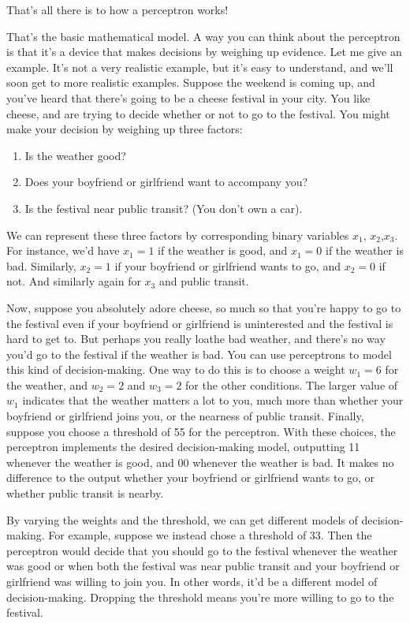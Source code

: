 \documentclass[a4paper,12pt]{report}%
\begin{document}
That's all there is to how a perceptron works!

That's the basic mathematical model. A way you can think about the perceptron is that it's a device that makes decisions by weighing up evidence. Let me give an example. It's not a very realistic example, but it's easy to understand, and we'll soon get to more realistic examples. Suppose the weekend is coming up, and you've heard that there's going to be a cheese festival in your city. You like cheese, and are trying to decide whether or not to go to the festival. You might make your decision by weighing up three factors:

\begin{enumerate}
 \item Is the weather good?
 \item Does your boyfriend or girlfriend want to accompany you?
 \item Is the festival near public transit? (You don't own a car).
\end{enumerate}

We can represent these three factors by corresponding binary variables $x_{1}$, $x_{2}$,$ x_{3}$. For instance, we'd have $x_{1} = 1$ if the weather is good, and $x_{1} = 0$ if the weather is bad. Similarly, $x_{2} = 1$ if your boyfriend or girlfriend wants to go, and $x_{2} = 0$ if not. And similarly again for $x_{3}$ and public transit.

Now, suppose you absolutely adore cheese, so much so that you're happy to go to the festival even if your boyfriend or girlfriend is uninterested and the festival is hard to get to. But perhaps you really loathe bad weather, and there's no way you'd go to the festival if the weather is bad. You can use perceptrons to model this kind of decision-making. One way to do this is to choose a weight $w_{1} = 6$ for the weather, and $w_{2} = 2$ and $w_{3} = 2$ for the other conditions. The larger value of $w_{1}$ indicates that the weather matters a lot to you, much more than whether your boyfriend or girlfriend joins you, or the nearness of public transit. Finally, suppose you choose a threshold of 55 for the perceptron. With these choices, the perceptron implements the desired decision-making model, outputting 11 whenever the weather is good, and 00 whenever the weather is bad. It makes no difference to the output whether your boyfriend or girlfriend wants to go, or whether public transit is nearby.


By varying the weights and the threshold, we can get different models of decision-making. For example, suppose we instead chose a threshold of 33. Then the perceptron would decide that you should go to the festival whenever the weather was good or when both the festival was near public transit and your boyfriend or girlfriend was willing to join you. In other words, it'd be a different model of decision-making. Dropping the threshold means you're more willing to go to the festival.
\end{document}
